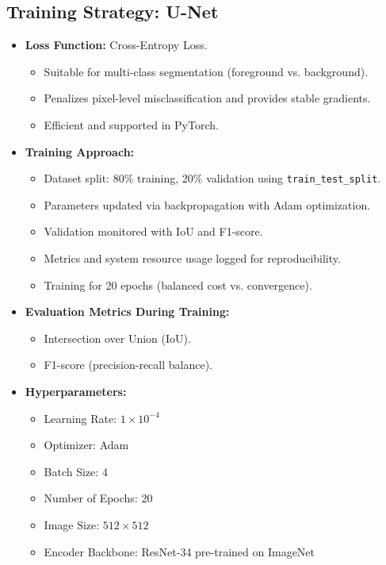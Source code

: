 \documentclass[rnd]{mas_proposal}
\begin{document}
\subsection{Training Strategy: U-Net}
\begin{itemize}
    \item \textbf{Loss Function:} Cross-Entropy Loss.  
    \begin{itemize}
        \item Suitable for multi-class segmentation (foreground vs. background). 
        \item Penalizes pixel-level misclassification and provides stable gradients. 
        \item Efficient and supported in PyTorch. 
    \end{itemize}

    \item \textbf{Training Approach:} 
    \begin{itemize}
        \item Dataset split: 80\% training, 20\% validation using \texttt{train\_test\_split}. 
        \item Parameters updated via backpropagation with Adam optimization. 
        \item Validation monitored with IoU and F1-score. 
        \item Metrics and system resource usage logged for reproducibility. 
        \item Training for 20 epochs (balanced cost vs. convergence). 
    \end{itemize}

    \item \textbf{Evaluation Metrics During Training:} 
    \begin{itemize}
        \item Intersection over Union (IoU). 
        \item F1-score (precision-recall balance). 
    \end{itemize}

    \item \textbf{Hyperparameters:} 
    \begin{itemize}
        \item Learning Rate: $1 \times 10^{-4}$  
        \item Optimizer: Adam  
        \item Batch Size: 4  
        \item Number of Epochs: 20  
        \item Image Size: $512 \times 512$  
        \item Encoder Backbone: ResNet-34 pre-trained on ImageNet  
    \end{itemize}


\end{itemize}
\end{document}
